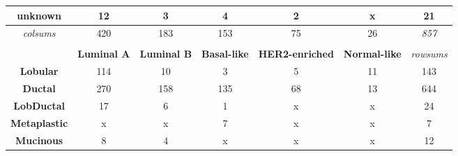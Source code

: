 \begin{table}[!h]
\begin{tabular}{ccccccc}
                \multicolumn{1}{c|}{\textbf{unknown}} & \multicolumn{1}{c|}{12} & \multicolumn{1}{c|}{3} & \multicolumn{1}{c|}{4} & \multicolumn{1}{c|}{2} & \multicolumn{1}{c|}{{\color[HTML]{656565} x}} & \multicolumn{1}{c|}{{\color[HTML]{656565} 21}} \\ \hline
                \multicolumn{1}{c|}{{\color[HTML]{9B9B9B} \textit{colsums}}} & \multicolumn{1}{c|}{{\color[HTML]{656565} 420}} & \multicolumn{1}{c|}{{\color[HTML]{656565} 183}} & \multicolumn{1}{c|}{{\color[HTML]{656565} 153}} & \multicolumn{1}{c|}{{\color[HTML]{656565} 75}} & \multicolumn{1}{c|}{{\color[HTML]{656565} 26}} & \multicolumn{1}{c|}{\textit{857}} \\ \cline{2-7} 
                \multicolumn{1}{l}{} & \multicolumn{1}{l}{} & \multicolumn{1}{l}{} & \multicolumn{1}{l}{} & \multicolumn{1}{l}{} & \multicolumn{1}{l}{} & \multicolumn{1}{l}{} \\
                \multicolumn{1}{c|}{} & \multicolumn{1}{c|}{\textbf{Luminal A}} & \multicolumn{1}{c|}{\textbf{Luminal B}} & \multicolumn{1}{c|}{\textbf{Basal-like}} & \multicolumn{1}{c|}{\textbf{HER2-enriched}} & \multicolumn{1}{c|}{\textbf{Normal-like}} & {\color[HTML]{9B9B9B} \textit{rowsums}} \\ \hline
                \multicolumn{1}{c|}{\textbf{Lobular}} & \multicolumn{1}{c|}{114} & \multicolumn{1}{c|}{10} & \multicolumn{1}{c|}{3} & \multicolumn{1}{c|}{5} & \multicolumn{1}{c|}{11} & \multicolumn{1}{c|}{{\color[HTML]{656565} 143}} \\ \hline
                \multicolumn{1}{c|}{\textbf{Ductal}} & \multicolumn{1}{c|}{270} & \multicolumn{1}{c|}{158} & \multicolumn{1}{c|}{135} & \multicolumn{1}{c|}{68} & \multicolumn{1}{c|}{13} & \multicolumn{1}{c|}{{\color[HTML]{656565} 644}} \\ \hline
                \multicolumn{1}{c|}{{\color[HTML]{000000} \textbf{LobDuctal}}} & \multicolumn{1}{c|}{17} & \multicolumn{1}{c|}{6} & \multicolumn{1}{c|}{1} & \multicolumn{1}{c|}{{\color[HTML]{656565} x}} & \multicolumn{1}{c|}{{\color[HTML]{656565} x}} & \multicolumn{1}{c|}{{\color[HTML]{656565} 24}} \\ \hline
                \multicolumn{1}{c|}{\textbf{Metaplastic}} & \multicolumn{1}{c|}{{\color[HTML]{656565} x}} & \multicolumn{1}{c|}{{\color[HTML]{656565} x}} & \multicolumn{1}{c|}{7} & \multicolumn{1}{c|}{{\color[HTML]{656565} x}} & \multicolumn{1}{c|}{{\color[HTML]{656565} x}} & \multicolumn{1}{c|}{{\color[HTML]{656565} 7}} \\ \hline
                \multicolumn{1}{c|}{\textbf{Mucinous}} & \multicolumn{1}{c|}{8} & \multicolumn{1}{c|}{4} & \multicolumn{1}{c|}{{\color[HTML]{656565} x}} & \multicolumn{1}{c|}{{\color[HTML]{656565} x}} & \multicolumn{1}{c|}{{\color[HTML]{656565} x}} & \multicolumn{1}{c|}{{\color[HTML]{656565} 12}} \\ \hline

\end{tabular}
\end{table}
